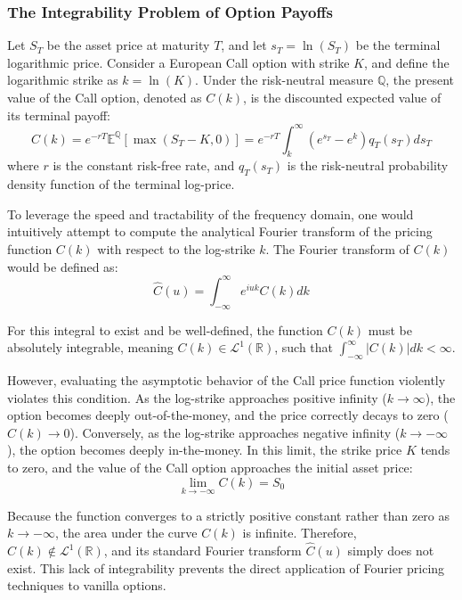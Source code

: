 \subsubsection{The Integrability Problem of Option Payoffs}

Let $S_T$ be the asset price at maturity $T$, and let $s_T = \ln(S_T)$ be the terminal logarithmic price. Consider a European Call option with strike $K$, and define the logarithmic strike as $k = \ln(K)$. Under the risk-neutral measure $\mathbb{Q}$, the present value of the Call option, denoted as $C(k)$, is the discounted expected value of its terminal payoff:
\begin{equation}
    C(k) = e^{-rT} \mathbb{E}^{\mathbb{Q}}[\max(S_T - K, 0)] = e^{-rT} \int_{k}^{\infty} (e^{s_T} - e^k) q_T(s_T) ds_T
\end{equation}
where $r$ is the constant risk-free rate, and $q_T(s_T)$ is the risk-neutral probability density function of the terminal log-price.

To leverage the speed and tractability of the frequency domain, one would intuitively attempt to compute the analytical Fourier transform of the pricing function $C(k)$ with respect to the log-strike $k$. The Fourier transform of $C(k)$ would be defined as:
\begin{equation}
    \hat{C}(u) = \int_{-\infty}^{\infty} e^{iuk} C(k) dk
\end{equation}

For this integral to exist and be well-defined, the function $C(k)$ must be absolutely integrable, meaning $C(k) \in \mathcal{L}^1(\mathbb{R})$, such that $\int_{-\infty}^{\infty} |C(k)| dk < \infty$. 

However, evaluating the asymptotic behavior of the Call price function violently violates this condition. As the log-strike approaches positive infinity ($k \to \infty$), the option becomes deeply out-of-the-money, and the price correctly decays to zero ($C(k) \to 0$). Conversely, as the log-strike approaches negative infinity ($k \to -\infty$), the option becomes deeply in-the-money. In this limit, the strike price $K$ tends to zero, and the value of the Call option approaches the initial asset price:
\begin{equation}
    \lim_{k \to -\infty} C(k) = S_0
\end{equation}

Because the function converges to a strictly positive constant rather than zero as $k \to -\infty$, the area under the curve $C(k)$ is infinite. Therefore, $C(k) \notin \mathcal{L}^1(\mathbb{R})$, and its standard Fourier transform $\hat{C}(u)$ simply does not exist. This lack of integrability prevents the direct application of Fourier pricing techniques to vanilla options.
